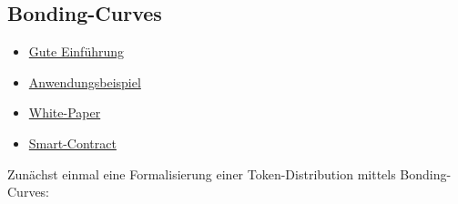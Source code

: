 
\subsection{Bonding-Curves}
\label{sec:bonding-curves}

\vspace{0.3cm}

\begin{itemize}
  \item \href{https://medium.com/@simondlr/tokens-2-0-curved-token-bonding-in-curation-markets-1764a2e0bee5}{Gute Einführung}
  \item \href{https://www.newsbtc.com/sponsored/zap-fun-profit/}{Anwendungsbeispiel}
  \item \href{https://docs.google.com/document/d/1VNkBjjGhcZUV9CyC0ccWYbqeOoVKT2maqX0rK3yXB20/edit}{White-Paper}
  \item \href{https://github.com/ConsenSysMesh/curationmarkets/blob/master/CurationMarkets.sol}{Smart-Contract}
\end{itemize}  



\vspace{0.5cm}

Zunächst einmal eine Formalisierung einer Token-Distribution mittels Bonding-Curves:

\vspace{0.2cm}

